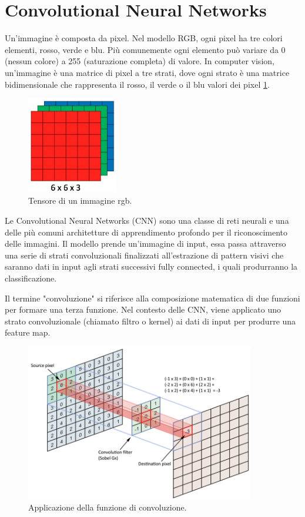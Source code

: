 \section{Convolutional Neural Networks}
Un'immagine è composta da pixel. Nel modello RGB, ogni pixel ha tre colori elementi, rosso, verde e blu. Più comunemente ogni elemento può variare da 0 (nessun colore) a 255 (saturazione completa) di valore. In computer vision, un'immagine è una matrice di pixel a tre strati, dove ogni strato è una matrice bidimensionale che rappresenta il rosso, il verde o il blu valori dei pixel \ref{rgb_tensor}.


\begin{figure}[htb]
	\centering
	\includegraphics[width = 40mm]{images/rgb_tensor.png}
	\caption{Tensore di un immagine rgb.}
	\label{rgb_tensor}
\end{figure}


Le Convolutional Neural Networks (CNN) sono una classe di reti neurali e una delle più comuni architetture di apprendimento profondo per il riconoscimento delle immagini. Il modello prende un'immagine di input, essa passa attraverso una serie di strati convoluzionali finalizzati all'estrazione di pattern visivi che saranno dati in input agli strati successivi fully connected, i quali produrranno la classificazione.


Il termine "convoluzione" si riferisce alla composizione matematica di due funzioni per formare una terza funzione. Nel contesto delle CNN, viene applicato uno strato convoluzionale (chiamato filtro o kernel) ai dati di input per produrre una feature map.

\begin{figure}[htb]
	\centering
	\includegraphics[width = 100mm]{images/conv1.png}
	\caption{Applicazione della funzione di convoluzione.}
	\label{conv1}
\end{figure}

